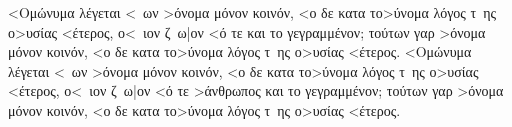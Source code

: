\documentclass[12pt,a4paper]{book}
\begin{document}
\beginnumbering
{}
 \pstart <Ομώνυμα λέγεται <~ων >όνομα μόνον κοινόν, <ο δε κατα το>ύνομα λόγος τ~ης ο>υσίας <έτερος, ο<~ιον ζ~ω|ον <ό τε  και το γεγραμμένον; τούτων γαρ >όνομα μόνον κοινόν, <ο δε κατα το>ύνομα λόγος τ~ης ο>υσίας <έτερος. <Ομώνυμα λέγεται <~ων >όνομα μόνον κοινόν, <ο δε κατα το>ύνομα λόγος τ~ης ο>υσίας <έτερος, ο<~ιον ζ~ω|ον <ό τε >άνθρωπος και το γεγραμμένον; τούτων γαρ >όνομα μόνον κοινόν, <ο δε κατα το>ύνομα λόγος τ~ης ο>υσίας <έτερος. \pend 
\endnumbering


\printindex
\end{document}
